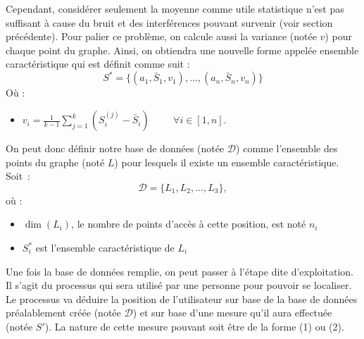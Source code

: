 \documentclass[10pt,journal,compsoc]{IEEEtran}
\begin{document}
		Cependant, considérer seulement la moyenne comme utile statistique n'est pas suffisant à cause du bruit et des interférences pouvant survenir (voir section précédente).
		Pour palier ce problème, on calcule aussi la variance (notée $v$) pour chaque point du graphe. Ainsi, on obtiendra une nouvelle forme appelée ensemble caractéristique
		qui est définit comme suit :
        \begin{equation}
          S^{*} = \{(a_{1}, \bar{S}_{1}, v_{1}), ..., (a_{n}, \bar{S}_{n}, v_{n})\}
        \end{equation}
        Où :
        \begin{itemize}
          \item $v_{i} = \frac{1}{k-1}\sum\limits_{j = 1}^{k}(S_{i}^{(j)}-\bar{S}_{i}) \hspace{1cm} \forall i \in [1,n]$.
        \end{itemize}
        On peut donc définir notre base de données (notée $\mathcal{D}$) comme l'ensemble des points du graphe (noté $L$) pour lesquels il existe un ensemble caractéristique.
		Soit~:
        \begin{equation}
          \mathcal{D} = \{L_{1}, L_{2}, ..., L_{3}\},
        \end{equation}
        où :
        \begin{itemize}
          \item $\dim(L_{i})$, le nombre de points d'accès à cette position, est noté $n_{i}$
          \item $S_{i}^{*}$ est l'ensemble caractéristique de $L_{i}$
        \end{itemize}

        Une fois la base de données remplie, on peut passer à l'étape dite d'exploitation. Il s'agit du processus qui sera utilisé par une personne pour pouvoir se localiser.
        Le processus va déduire la position de l'utilisateur sur base de la base de données préalablement créée (notée $\mathcal{D}$) et sur base d'une mesure qu'il aura effectuée
		(notée $S'$). La nature de cette mesure pouvant soit être de la forme (1) ou (2).
\end{document}
